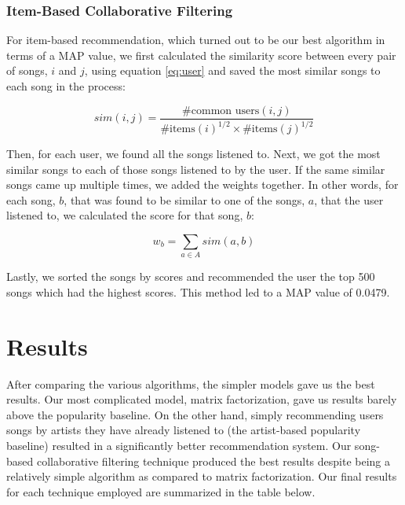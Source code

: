 \documentclass[11pt,preprint]{aastex}
\begin{document}
\subsubsection{Item-Based Collaborative Filtering}
For item-based recommendation, which turned out to be our best algorithm in terms of a MAP value, we first calculated the similarity score between every pair of songs, $i$ and $j$, using equation \ref{eq:user} and saved the most similar songs to each song in the process:

\begin{equation}
sim(i,j) = \frac{\text{\# common users}(i, j)}{{\text{\# items}(i)}^{1/2} \times {\text{\# items}(j)}^{1/2}}
\label{eq:user}
\end{equation}

Then, for each user, we found all the songs listened to. Next, we got the most similar songs to each of those songs listened to by the user. If the same similar songs came up multiple times, we added the weights together. In other words, for each song, $b$, that was found to be similar to one of the songs, $a$, that the user listened to, we calculated the score for that song, $b$:

$$w_b = \sum_{a \in A} sim(a, b)$$

Lastly, we sorted the songs by scores and recommended the user the top 500 songs which had the highest scores. This method led to a MAP value of 0.0479.





\section{Results}
After comparing the various algorithms, the simpler models gave us the best results. Our most complicated model, matrix factorization, gave us results barely above the popularity baseline. On the other hand, simply recommending users songs by artists they have already listened to (the artist-based popularity baseline) resulted in a significantly better recommendation system. Our song-based collaborative filtering technique produced the best results despite being a relatively simple algorithm as compared to matrix factorization. Our final results for each technique employed are summarized in the table below. 
\end{document}
